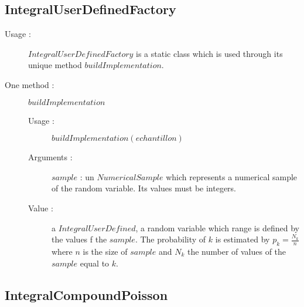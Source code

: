 \subsection{IntegralUserDefinedFactory}


\begin{description}

\item[Usage :] $IntegralUserDefinedFactory$ is a static class which is  used through its unique method $buildImplementation$.

\item[One method :]  $buildImplementation$
    \begin{description}

    \item[Usage :] $buildImplementation(echantillon)$

    \item[Arguments :]  $sample$ : un $NumericalSample$ which represents a numerical sample of the random variable. Its values must be integers.

    \item[Value :]  a $IntegralUserDefined$, a random variable which range is defined by the values f the $sample$. The probability of $k$ is estimated by  $ p_k = \displaystyle \frac{N_k}{n}$ where  $n$  is the size of $sample$ and $N_k$ the number of values of the $sample$ equal to $k$.

    \end{description}
 

 
\end{description}



\subsection{IntegralCompoundPoisson}



